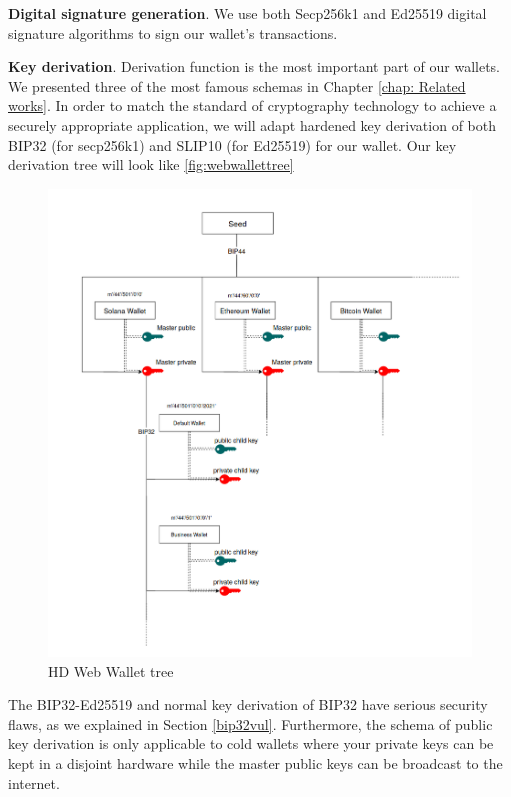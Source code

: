 \bigskip
{\textbf{Digital signature generation}}. We use both Secp256k1 and Ed25519 digital signature algorithms to sign our wallet’s transactions.

\bigskip
{\textbf{Key derivation}}. Derivation function is the most important part of our wallets. We presented three of the most famous schemas in Chapter \ref{chap: Related works}. In order to match the standard of cryptography technology to achieve a securely appropriate application, we will adapt hardened key derivation of both BIP32 (for secp256k1) and SLIP10 (for Ed25519) for our wallet.
Our key derivation tree will look like \autoref{fig:webwallettree}

\begin{figure}[!ht]
    \centering
    \includegraphics[width=1\textwidth]{images/tree_web_wallet.png}
    \caption[HD Web Wallet tree]{HD Web Wallet tree}
    \label{fig:webwallettree}
\end{figure}

The BIP32-Ed25519 and normal key derivation of BIP32 have serious security flaws, as we explained in Section \ref{bip32vul}. Furthermore, the schema of public key derivation is only applicable to cold wallets where your private keys can be kept in a disjoint hardware while the master public keys can be broadcast to the internet.


